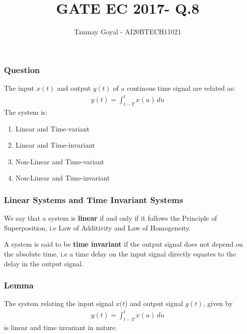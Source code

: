 \documentclass{beamer}
\title{GATE EC 2017- Q.8}
\author{Tanmay Goyal - AI20BTECH11021}
\date{}
\begin{document}
\begin{frame}
\titlepage
\end{frame}
\begin{frame}
\frametitle{Question}
\begin{flushleft}
The input $x(t)$ and output $y(t)$ of a continous time signal are related as:
\begin{align}
    y(t) = \int_{t-T}^tx(u)\,du
\end{align}
The system is:
\begin{enumerate}
    \item Linear and Time-variant
    \item Linear and Time-invariant
    \item Non-Linear and Time-variant
    \item Non-Linear and Time-invariant
\end{enumerate}
\end{flushleft}
\end{frame}

\begin{frame}[fragile]
\frametitle{Linear Systems and Time Invariant Systems}

\begin{flushleft}
\begin{definition}
We say that a system is\textbf{ linear} if and only if it follows the Principle of Superposition, i.e Law of Additivity and Law of Homogeneity.
\label{L}
\end{definition}
          \end{flushleft}
    \begin{flushleft}
    \begin{definition}
A system is said to be \textbf{time invariant} if the output signal does not depend on the absolute time, i.e a time delay on the input signal directly equates to the delay in the output signal.
\label{T}
\end{definition}
\end{flushleft}
\end{frame}


\begin{frame}[fragile]
\frametitle{Lemma}
\begin{flushleft}
\begin{lemma}
The system relating the input signal $x(t$) and output signal $y(t)$, given by 
\begin{align}
     y(t) = \int_{t-T}^tx(u)\,du
\end{align}
is linear and time invariant in nature.
\end{lemma}
\end{flushleft}

\end{frame}
\end{document}
